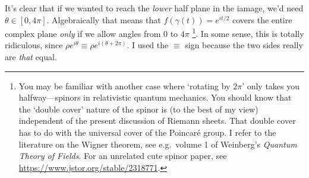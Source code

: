 \documentclass[
  11pt,
	colorful,
	raggedright,
]{tufte-style-thesis-flip}
\begin{document}
It's clear that if we wanted to reach the \emph{lower} half plane in the iamage, we'd need $\theta \in [0, 4\pi]$. Algebraically that means that $f(\gamma(t)) = e^{it/2}$ covers the entire complex plane \emph{only} if we allow angles from 0 to $4\pi$
\footnote{You may be familiar with another case where `rotating by $2\pi$' only takes you halfway---spinors in relativistic quantum mechanics. You should know that the `double cover' nature of the spinor is (to the best of my view) independent of the present discussion of Riemann sheets. That double cover has to do with the universal cover of the Poincar\'e group. I refer to the literature on the Wigner theorem, see e.g.\ volume 1 of Weinberg's \emph{Quantum Theory of Fields}. For an unrelated cute spinor paper, see \url{https://www.jstor.org/stable/2318771}.}. In some sense, this is totally ridiculous, since $\rho e^{i\theta} \equiv \rho e^{i(\theta+2\pi)}$. I used the $\equiv$ sign because the two sides really are \emph{that} equal.
\end{document}
